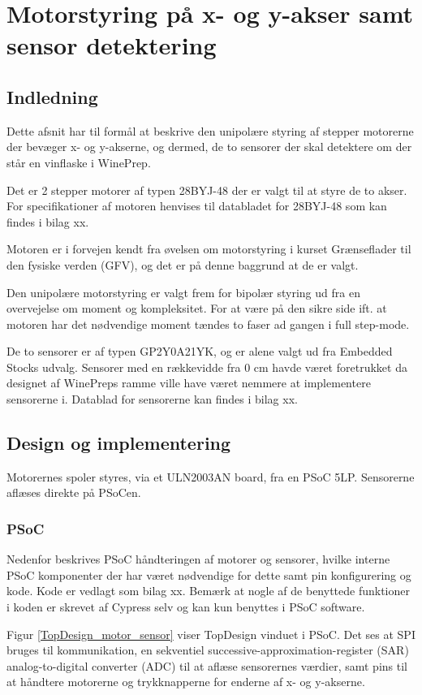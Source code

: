 \chapter{Motorstyring på x- og y-akser samt sensor detektering}
\section{Indledning}
Dette afsnit har til formål at beskrive den unipolære styring af stepper motorerne der bevæger x- og y-akserne, og dermed, de to sensorer der skal detektere om der står en vinflaske i WinePrep.

Det er 2 stepper motorer af typen 28BYJ-48 der er valgt til at styre de to akser. For specifikationer af motoren henvises til databladet for 28BYJ-48 som kan findes i bilag xx.

Motoren er i forvejen kendt fra øvelsen om motorstyring i kurset Grænseflader til den fysiske verden (GFV), og det er på denne baggrund at de er valgt.

Den unipolære motorstyring er valgt frem for bipolær styring ud fra en overvejelse om moment og kompleksitet. For at være på den sikre side ift. at motoren har det nødvendige moment tændes to faser ad gangen i full step-mode.

De to sensorer er af typen GP2Y0A21YK, og er alene valgt ud fra Embedded Stocks udvalg. Sensorer med en rækkevidde fra 0 cm havde været foretrukket da designet af WinePreps ramme ville have været nemmere at implementere sensorerne i. Datablad for sensorerne kan findes i bilag xx.

\section{Design og implementering}
Motorernes spoler styres, via et ULN2003AN board, fra en PSoC 5LP. Sensorerne aflæses direkte på PSoCen.

\subsection{PSoC}
Nedenfor beskrives PSoC håndteringen af motorer og sensorer, hvilke interne PSoC komponenter der har været nødvendige for dette samt pin konfigurering og kode. Kode er vedlagt som bilag xx. Bemærk at nogle af de benyttede funktioner i koden er skrevet af Cypress selv og kan kun benyttes i PSoC software.

Figur \ref{TopDesign_motor_sensor} viser TopDesign vinduet i PSoC. Det ses at SPI bruges til kommunikation, en sekventiel successive-approximation-register (SAR) analog-to-digital converter (ADC) til at aflæse sensorernes værdier, samt pins til at håndtere motorerne og trykknapperne for enderne af x- og y-akserne.

